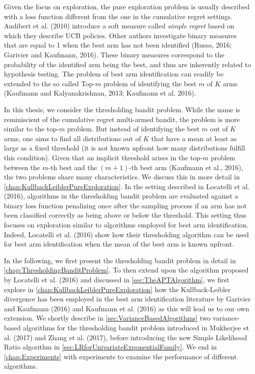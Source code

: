 \documentclass[11pt,]{article}
\begin{document}
Given the focus on exploration, the pure exploration problem is usually
described with a loss function different from the one in the cumulative
regret settings. Audibert et al. (2010) introduce a soft measure called
\emph{simple regret} based on which they describe UCB policies. Other
authors investigate binary measures that are equal to 1 when the best
arm has not been identified (Russo, 2016; Garivier and Kaufmann, 2016).
These binary measures correspond to the probability of the identified
arm being the best, and thus are inherently related to hypothesis
testing. The problem of best arm identification can readily be extended
to the so called Top-\(m\) problem of identifying the best \(m\) of
\(K\) arms (Kaufmann and Kalyanakrishnan, 2013; Kaufmann et al. 2016).

In this thesis, we consider the thresholding bandit problem. While the
name is reminiscient of the cumulative regret multi-armed bandit, the
problem is more similar to the top-\(m\) problem. But instead of
identifying the best \(m\) out of \(K\) arms, one aims to find all
distributions out of \(K\) that have a mean at least as large as a fixed
threshold (it is not known upfront how many distributions fulfill this
condition). Given that an implicit threshold arises in the top-\(m\)
problem between the \(m\)-th best and the \((m+1)\)-th best arm
(Kaufmann et al., 2016), the two problems share many characteristics. We
discuss this in more detail in
\autoref{chap:KullbackLeiblerPureExploration}. In the setting described
in Locatelli et al. (2016), algorithms in the thresholding bandit
problem are evaluated against a binary loss function penalizing once
after the sampling process if an arm has not been classified correctly
as being above or below the threshold. This setting thus focuses on
exploration similar to algorithms employed for best arm identification.
Indeed, Locatelli et al. (2016) show how their thresholding algorithm
can be used for best arm identification when the mean of the best arm is
known upfront.

In the following, we first present the thresholding bandit problem in
detail in \autoref{chap:ThresholdingBanditProblem}. To then extend upon
the algorithm proposed by Locatelli et al. (2016) and discussed in
\autoref{sec:TheAPTAlgorithm}, we first explore in
\autoref{chap:KullbackLeiblerPureExploration} how the Kullback-Leibler
divergence has been employed in the best arm identification literature
by Garivier and Kaufmann (2016) and Kaufmann et al. (2016) as this will
lead us to our own extension. We shortly describe in
\autoref{sec:VarianceBasedAlgorithms} two variance-based algorithms for
the thresholding bandit problem introduced in Mukherjee et al. (2017)
and Zhang et al. (2017), before introducing the new Simple Likelihood
Ratio algorithm in \autoref{sec:LRforUnivariateExponentialFamily}. We
end in \autoref{chap:Experiments} with experiments to examine the
performance of different algorithms.
\end{document}
